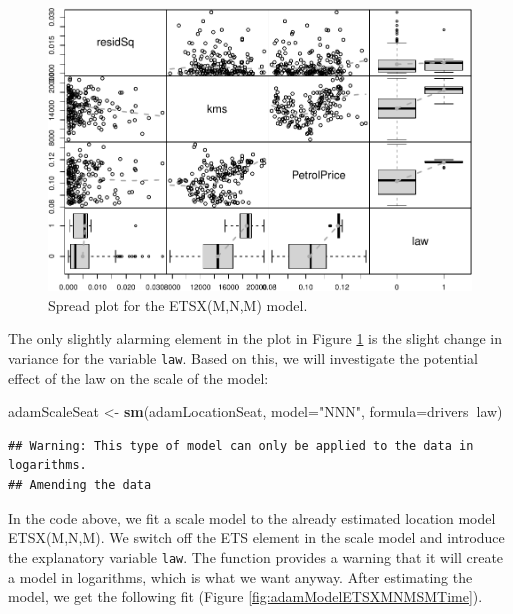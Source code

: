 \documentclass[]{book}
\newenvironment{Shaded}{\begin{snugshade}}{\end{snugshade}}
\newcommand{\DataTypeTok}[1]{\textcolor[rgb]{0.13,0.29,0.53}{#1}}
\newcommand{\KeywordTok}[1]{\textcolor[rgb]{0.13,0.29,0.53}{\textbf{#1}}}
\newcommand{\NormalTok}[1]{#1}
\newcommand{\OperatorTok}[1]{\textcolor[rgb]{0.81,0.36,0.00}{\textbf{#1}}}
\newcommand{\StringTok}[1]{\textcolor[rgb]{0.31,0.60,0.02}{#1}}
\theoremstyle{definition}
\theoremstyle{definition}
\theoremstyle{definition}
\theoremstyle{definition}
\theoremstyle{remark}
\begin{document}
\begin{figure}
\centering
\includegraphics{Svetunkov--2022----ADAM_files/figure-latex/adamModelETSXMNMDiagnosticsXreg-1.pdf}
\caption{\label{fig:adamModelETSXMNMDiagnosticsXreg}Spread plot for the ETSX(M,N,M) model.}
\end{figure}

The only slightly alarming element in the plot in Figure \ref{fig:adamModelETSXMNMDiagnosticsXreg} is the slight change in variance for the variable \texttt{law}. Based on this, we will investigate the potential effect of the law on the scale of the model:

\begin{Shaded}
\begin{Highlighting}[]
\NormalTok{adamScaleSeat <-}\StringTok{ }\KeywordTok{sm}\NormalTok{(adamLocationSeat, }\DataTypeTok{model=}\StringTok{"NNN"}\NormalTok{, }\DataTypeTok{formula=}\NormalTok{drivers}\OperatorTok{~}\NormalTok{law)}
\end{Highlighting}
\end{Shaded}

\begin{verbatim}
## Warning: This type of model can only be applied to the data in logarithms.
## Amending the data
\end{verbatim}

In the code above, we fit a scale model to the already estimated location model ETSX(M,N,M). We switch off the ETS element in the scale model and introduce the explanatory variable \texttt{law}. The function provides a warning that it will create a model in logarithms, which is what we want anyway. After estimating the model, we get the following fit (Figure \ref{fig:adamModelETSXMNMSMTime}).
\end{document}
